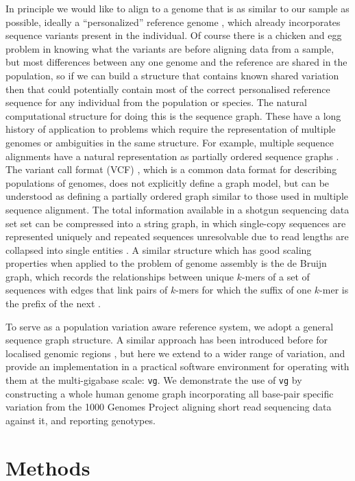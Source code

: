 \documentclass[12pt]{article}
\begin{document}
In principle we would like to align to a genome that is as similar to our sample as possible, ideally a ``personalized'' reference genome \cite{Yuan_2012}, which already incorporates sequence variants present in the individual.  
Of course there is a chicken and egg problem in knowing what the variants are before aligning data from a sample, but most differences between any one genome and the reference are shared in the population, so if we can build a structure that contains known shared variation then that could potentially contain most of the correct personalised reference sequence for any individual from the population or species.
The natural computational structure for doing this is the sequence graph.
These have a long history of application to problems which require the representation of multiple genomes or ambiguities in the same structure.
For example, multiple sequence alignments have a natural representation as partially ordered sequence graphs \cite{lee2002POA}.
The variant call format (VCF) \cite{danecek2011}, which is a common data format for describing populations of genomes, does not explicitly define a graph model, but can be understood as defining a partially ordered graph similar to those used in multiple sequence alignment. 
The total information available in a shotgun sequencing data set set can be compressed into a string graph, in which single-copy sequences are represented uniquely and repeated sequences unresolvable due to read lengths are collapsed into single entities \cite{myers2005, simpson2010}.
A similar structure which has good scaling properties when applied to the problem of genome assembly is the de Bruijn graph, which records the relationships between unique $k$-mers of a set of sequences with edges that link pairs of $k$-mers for which the suffix of one $k$-mer is the prefix of the next \cite{iqbal2012}.

To serve as a population variation aware reference system, we adopt a general sequence graph structure. 
A similar approach has been introduced before for localised genomic regions \cite{prg2015}, but here we extend to a wider range of variation, and provide an implementation in a practical software environment for operating with them at the multi-gigabase scale: {\tt vg}. 
We demonstrate the use of {\tt vg} by constructing a whole human genome graph incorporating all base-pair specific variation from the 1000 Genomes Project \cite{1000g2015} aligning short read sequencing data against it, and reporting genotypes.

\section{Methods}
\end{document}
